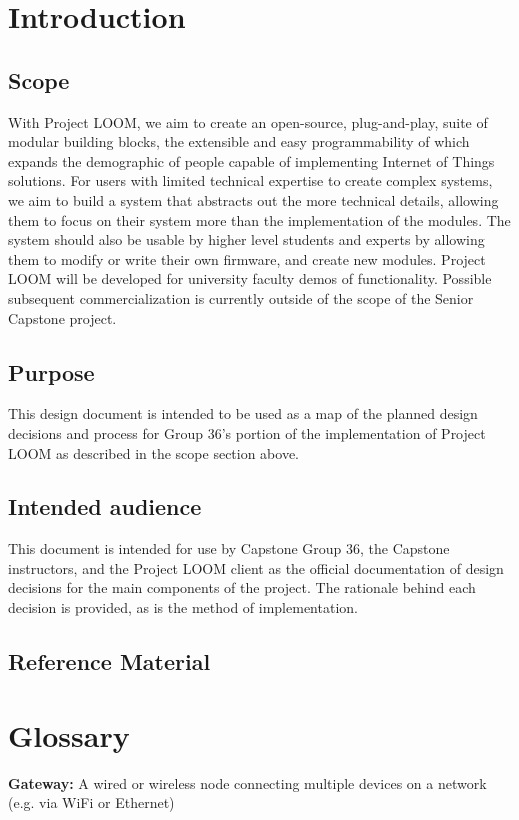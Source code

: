 \documentclass[onecolumn, draftclsnofoot,10pt, compsoc]{IEEEtran}
\begin{document}
\section{Introduction}
\subsection{Scope}  
    With Project LOOM, we aim to create an open-source, plug-and-play, suite of modular building blocks, the extensible and easy programmability of which expands the demographic of people capable of implementing Internet of Things solutions. For users with limited technical expertise to create complex systems, we aim to build a system that abstracts out the more technical details, allowing them to focus on their system more than the implementation of the modules. The system should also be usable by higher level students and experts by allowing them to modify or write their own firmware, and create new modules. Project LOOM will be developed for university faculty demos of functionality. Possible subsequent commercialization is currently outside of the scope of the Senior Capstone project.

\subsection{Purpose}
    This design document is intended to be used as a map of the planned design decisions and process for Group 36's portion of the implementation of Project LOOM as described in the scope section above.
                
\subsection{Intended audience}
    This document is intended for use by Capstone Group 36, the Capstone instructors, and the Project LOOM client as the official documentation of design decisions for the main components of the project. The rationale behind each decision is provided, as is the method of implementation.

\subsection{Reference Material}
    \renewcommand{\listfigurename}{}
    \vspace{-40pt}
    \listoffigures

\section{Glossary}
    \textbf{Gateway:} A wired or wireless node connecting multiple devices on a network (e.g. via WiFi or Ethernet)
\end{document}

